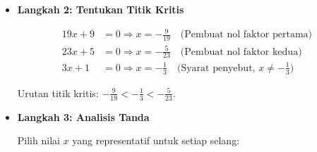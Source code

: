 \documentclass[10pt,a4paper]{article}
\newcounter{eqblock}
\newcommand{\reseteq}{%
  \stepcounter{eqblock}%
  \setcounter{equation}{0}%
  \renewcommand{\theHequation}{\arabic{eqblock}.\arabic{equation}}%
}
\begin{document}
\begin{enumerate}
\begin{itemize}
\begin{itemize}
\reseteq
\begin{align}
\left|\frac{x-1}{3x+1}\right| &\leq \frac{7}{2} \quad \text{(Pertidaksamaan awal)} \\
\text{Menggunakan sifat 5: } \left|\frac{x-1}{3x+1}\right| &= \frac{|x-1|}{|3x+1|} \\
\frac{|x-1|}{|3x+1|} &\leq \frac{7}{2} \\
|x-1| &\leq \frac{7}{2}\,|3x+1| \quad \text{(Kali dengan $|3x+1| > 0$)} \\
2\,|x-1| &\leq 7\,|3x+1| \quad \text{(Kali kedua ruas dengan 2)} \\
|2|\,|x-1| &\leq |7|\,|3x+1| \quad \text{($2=|2|$ dan $7=|7|$)} \\
\text{Menggunakan sifat: } |ab| &= |a||b| \nonumber \\
|2x-2| &\leq |21x+7| \\
\text{Menggunakan sifat 4: } |a| \leq |b| &\Leftrightarrow a^2 \leq b^2 \\
(2x-2)^2 &\leq (21x+7)^2 \\
(2x-2)^2 - (21x+7)^2 &\leq 0 \quad \text{(Kurangi $(21x+7)^2$)} \\
\text{Menggunakan } a^2 - b^2 &= (a + b)(a - b): \\
[(2x-2) + (21x+7)][(2x-2) - (21x+7)] &\leq 0 \\
(23x+5)(-19x-9) &\leq 0 \\
-(23x+5)(19x+9) &\leq 0 \quad \text{(Keluarkan faktor negatif)} \\
(23x+5)(19x+9) &\geq 0 \quad \text{(Kali $-1$, tanda berubah)}
\end{align}

\item \textbf{Langkah 2: Tentukan Titik Kritis}

\reseteq
\begin{align}
19x+9 &= 0 \Rightarrow x = -\frac{9}{19} \quad \text{(Pembuat nol faktor pertama)} \\
23x+5 &= 0 \Rightarrow x = -\frac{5}{23} \quad \text{(Pembuat nol faktor kedua)} \\
3x+1 &= 0 \Rightarrow x = -\frac{1}{3} \quad \text{(Syarat penyebut, } x \neq -\tfrac{1}{3}\text{)}
\end{align}

Urutan titik kritis: $-\frac{9}{19} < -\frac{1}{3} < -\frac{5}{23}$.

\item \textbf{Langkah 3: Analisis Tanda}

Pilih nilai $x$ yang representatif untuk setiap selang:


\end{itemize}
\end{itemize}
\end{enumerate}
\end{document}
